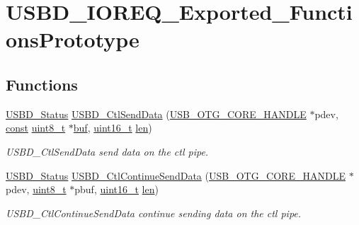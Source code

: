 \hypertarget{group___u_s_b_d___i_o_r_e_q___exported___functions_prototype}{\section{U\-S\-B\-D\-\_\-\-I\-O\-R\-E\-Q\-\_\-\-Exported\-\_\-\-Functions\-Prototype}
\label{group___u_s_b_d___i_o_r_e_q___exported___functions_prototype}
}
\subsection*{Functions}
\begin{DoxyCompactItemize}
\item 
\hyperlink{group___u_s_b_d___c_o_r_e___exported___defines_ga1c59ec10075b576176aa51c9ef4e9fc4}{U\-S\-B\-D\-\_\-\-Status} \hyperlink{group___u_s_b_d___i_o_r_e_q___exported___functions_prototype_ga07c10655e8ac833b27cb580912aa5f68}{U\-S\-B\-D\-\_\-\-Ctl\-Send\-Data} (\hyperlink{group___u_s_b___c_o_r_e___exported___types_gaf76054c11eb8a3367907aad7ae700e80}{U\-S\-B\-\_\-\-O\-T\-G\-\_\-\-C\-O\-R\-E\-\_\-\-H\-A\-N\-D\-L\-E} $\ast$pdev, \hyperlink{group___n_a_m_e_ga7ae6d0e43244213b34de2c2b9aa30da6}{const} \hyperlink{stdint_8h_aba7bc1797add20fe3efdf37ced1182c5}{uint8\-\_\-t} $\ast$\hyperlink{mavlink__helpers_8h_af5c51bef7cca88bcb22f0517fdb06153}{buf}, \hyperlink{stdint_8h_a273cf69d639a59973b6019625df33e30}{uint16\-\_\-t} \hyperlink{mavlink__helpers_8h_aba59486c1504340293255a065b546e3a}{len})
\begin{DoxyCompactList}\small\item\em U\-S\-B\-D\-\_\-\-Ctl\-Send\-Data send data on the ctl pipe. \end{DoxyCompactList}\item 
\hyperlink{group___u_s_b_d___c_o_r_e___exported___defines_ga1c59ec10075b576176aa51c9ef4e9fc4}{U\-S\-B\-D\-\_\-\-Status} \hyperlink{group___u_s_b_d___i_o_r_e_q___exported___functions_prototype_ga1226d3f2d0340a5bec332764c13e6eb4}{U\-S\-B\-D\-\_\-\-Ctl\-Continue\-Send\-Data} (\hyperlink{group___u_s_b___c_o_r_e___exported___types_gaf76054c11eb8a3367907aad7ae700e80}{U\-S\-B\-\_\-\-O\-T\-G\-\_\-\-C\-O\-R\-E\-\_\-\-H\-A\-N\-D\-L\-E} $\ast$pdev, \hyperlink{stdint_8h_aba7bc1797add20fe3efdf37ced1182c5}{uint8\-\_\-t} $\ast$pbuf, \hyperlink{stdint_8h_a273cf69d639a59973b6019625df33e30}{uint16\-\_\-t} \hyperlink{mavlink__helpers_8h_aba59486c1504340293255a065b546e3a}{len})
\begin{DoxyCompactList}\small\item\em U\-S\-B\-D\-\_\-\-Ctl\-Continue\-Send\-Data continue sending data on the ctl pipe. \end{DoxyCompactList}\item 

\end{DoxyCompactItemize}
